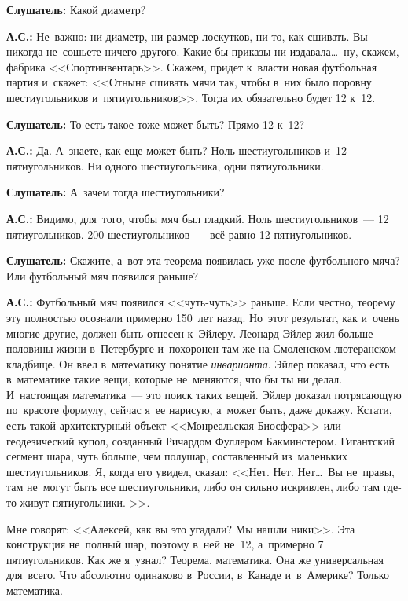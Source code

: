 \textbf{Слушатель:} Какой диаметр?

\textbf{А.С.:} Не~важно: ни диаметр, ни размер лоскутков, ни то, как сшивать. Вы никогда не~сошьете
ничего другого. Какие бы приказы ни издавала\ldots\ ну, скажем, фабрика <<Спортинвентарь>>. Скажем, придет
к~власти новая футбольная партия и~скажет: <<Отныне сшивать мячи так, чтобы в~них было поровну
шестиугольников и~пятиугольников>>. Тогда их обязательно будет 12 к~12.

\textbf{Слушатель:} То есть такое тоже может быть? Прямо 12 к~12?

\textbf{А.С.:} Да. А~знаете, как еще может быть? Ноль шестиугольников и~12 пятиугольников. Ни
одного шестиугольника, одни пятиугольники.

\textbf{Слушатель:} А~зачем тогда шестиугольники?

\textbf{А.С.:} Видимо, для~того, чтобы мяч был гладкий. Ноль шестиугольников~--- 12 пятиугольников.
200 шестиугольников~--- всё равно 12 пятиугольников.

\pagebreak

\textbf{Слушатель:} Скажите, а~вот эта теорема появилась уже после футбольного мяча? Или футбольный мяч
появился раньше?

\textbf{А.С.:} Футбольный мяч появился <<чуть-чуть>> раньше. Если честно, теорему эту полностью
осознали примерно 150~лет назад. Но~этот результат, как и~очень многие другие, должен быть отнесен
к~Эйлеру. Леонард Эйлер жил больше половины жизни в~Петербурге и~похоронен там же на Смоленском лютеранском кладбище.
Он ввел в~математику понятие \textit{инварианта}. Эйлер показал, что есть в~математике такие вещи,
которые не~меняются, что бы ты ни делал. И~настоящая математика~--- это поиск таких вещей. Эйлер
доказал потрясающую по~красоте формулу, сейчас я~ее нарисую, а~может быть, даже докажу. Кстати,
есть такой архитектурный объект <<Монреальская Биосфера>> или геодезический купол, созданный
Ричардом Фуллером Бакминстером. Гигантский сегмент шара, чуть больше, чем полушар, составленный
из~маленьких шестиугольников. Я, когда его увидел, сказал: <<Нет. Нет. Нет\ldots\ Вы не~правы, там
не~могут быть все шестиугольники, либо он сильно искривлен, либо там где-то живут
пятиугольники. >>.


Мне говорят: <<Алексей, как вы это угадали? Мы нашли \-ни\-ки>>. Эта конструкция не~полный шар,
поэтому в~ней не~12, а~примерно 7 пятиугольников.
Как же я~узнал? Теорема, математика. Она же
универсальная для~всего. Что абсолютно одинаково в~России, в~Канаде и~в~Америке? Только математика.

